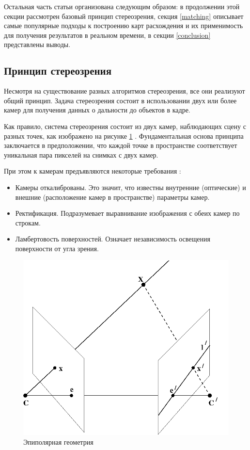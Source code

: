 Остальная часть статьи организована следующим образом: в продолжении этой секции рассмотрен базовый принцип стереозрения, секция \ref{matching} описывает 
самые популярные подходы к построению карт расхождения и их применимость для получения результатов в реальном времени, в секции \ref{conclusion} представлены выводы. 

\subsection{Принцип стереозрения}
Несмотря на существование разных алгоритмов стереозрения, все они реализуют общий принцип. Задача стереозрения 
 состоит в использовании двух или более камер для получения данных о дальности до объектов в кадре. 

Как правило, система стереозрения состоит из двух камер, наблюдающих сцену с разных точек, как изображено на рисунке \ref{pic:epipol} \cite{Hartley2004}. 
Фундаментальная основа принципа заключается в предположении, что каждой точке в пространстве соответствует уникальная пара пикселей на снимках с двух камер.  

При этом к камерам предъявляются некоторые требования \cite{rusoverview}:   %
\begin{itemize}
	\item Камеры откалиброваны. Это значит, что известны внутренние (оптические) и внешние (расположение камер в пространстве) параметры камер. 
	\item Ректификация. Подразумевает выравнивание изображения с обеих камер по строкам.  %
	\item Ламбертовость поверхностей. Означает независимость освещения поверхности от угла зрения. 
\end{itemize}

\begin{figure}[H]
	\begin{center}
		\includegraphics[scale=0.5]{pics/epipolar geometry.png}
		\caption{Эпиполярная геометрия} 
		\label{pic:epipol} %
	\end{center}
\end{figure}

